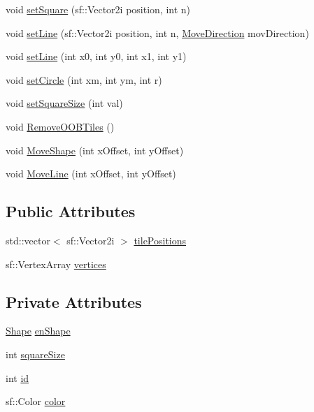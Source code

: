 \begin{DoxyCompactItemize}
\item 
void \mbox{\hyperlink{class_map_effect_a4c382be68e0b9dae8fb1f216c8cfc9a6}{set\+Square}} (sf\+::\+Vector2i position, int n)
\item 
void \mbox{\hyperlink{class_map_effect_a4f2bfbdac42379cf0206216a52441c1a}{set\+Line}} (sf\+::\+Vector2i position, int n, \mbox{\hyperlink{_enum_types_8hpp_a00ec4eba48da32d6cbdf827185fd3d34}{Move\+Direction}} mov\+Direction)
\item 
void \mbox{\hyperlink{class_map_effect_ac927f830b816bcf14d594db3c1d1e100}{set\+Line}} (int x0, int y0, int x1, int y1)
\item 
void \mbox{\hyperlink{class_map_effect_af9023620bb63c6ca99855742585d5cbe}{set\+Circle}} (int xm, int ym, int r)
\item 
void \mbox{\hyperlink{class_map_effect_adfa0231021b37a4fe775f33330454cb2}{set\+Square\+Size}} (int val)
\item 
void \mbox{\hyperlink{class_map_effect_a515c5ddb85a15fd44b2b8d27c1cee21a}{Remove\+O\+O\+B\+Tiles}} ()
\item 
void \mbox{\hyperlink{class_map_effect_a4a775648e056eda586a1d627467552d7}{Move\+Shape}} (int x\+Offset, int y\+Offset)
\item 
void \mbox{\hyperlink{class_map_effect_a0436f9350a55dabc183dd66024dc7895}{Move\+Line}} (int x\+Offset, int y\+Offset)
\end{DoxyCompactItemize}
\subsection*{Public Attributes}
\begin{DoxyCompactItemize}
\item 
std\+::vector$<$ sf\+::\+Vector2i $>$ \mbox{\hyperlink{class_map_effect_a3a61ab548ae00ef7abd123672c75e579}{tile\+Positions}}
\item 
sf\+::\+Vertex\+Array \mbox{\hyperlink{class_map_effect_ae3ee2ef0f261d4527b5af20e788af26e}{vertices}}
\end{DoxyCompactItemize}
\subsection*{Private Attributes}
\begin{DoxyCompactItemize}
\item 
\mbox{\hyperlink{_map_effect_8hpp_a55b506070847a13554f8b879c1bfb37c}{Shape}} \mbox{\hyperlink{class_map_effect_a3bf3a8ffe6c838dad83356be63b986f5}{en\+Shape}}
\item 
int \mbox{\hyperlink{class_map_effect_a4fb92217a562e90b9038977a2d660e25}{square\+Size}}
\item 
int \mbox{\hyperlink{class_map_effect_a9439d21ddced564043eba8fdf2c0e44e}{id}}
\item 
sf\+::\+Color \mbox{\hyperlink{class_map_effect_ae542c1aef75e386b30ec544c2dd411d3}{color}}
\end{DoxyCompactItemize}



